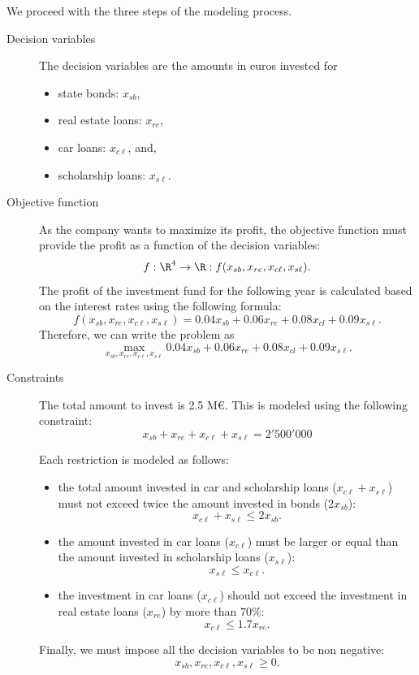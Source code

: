 
We proceed with the three steps of the modeling process.
\begin{description}
\item[Decision variables] The decision variables are the amounts in euros invested
  for
\begin{itemize}
\item   state bonds: $x_{sb}$,
\item real estate loans: $x_{re}$,
\item car loans:  $x_{c\ell}$, and,
 \item scholarship loans: $x_{s\ell}$.
\end{itemize}
\item[Objective function] As the company wants to maximize its profit,
  the objective function must provide the profit as a function of the
  decision variables:
  \[
f:\R^4 \to \R: f(x_{sb}, x_{re}, x_{c\ell},x_{s\ell}).
  \]
The profit of the investment fund for the following year is calculated
based on  the interest rates using the following formula:
\[
f(x_{sb}, x_{re}, x_{c\ell},x_{s\ell}) = 0.04 x_{sb} + 0.06 x_{re} + 0.08 x_{cl} + 0.09 x_{s\ell}. 
\]
Therefore, we can write the problem as 
\[
	\max_{x_{sb}, x_{re}, x_{c\ell},x_{s\ell}} 0.04 x_{sb} + 0.06 x_{re} + 0.08 x_{cl} + 0.09 x_{s\ell}. 
\]
\item[Constraints]
The total amount to invest is 2.5 M\euro.  This is modeled using the following constraint:
\[ 	x_{sb} + x_{re} + x_{c\ell} + x_{s\ell}  = 2'500'000 \]

Each restriction is modeled as follows:
\begin{itemize}
	\item the total amount invested in car and scholarship  loans
          ($	x_{c\ell} + x_{s\ell}$) must not exceed twice the
          amount invested in bonds ($2x_{sb}$):
	\[ 	x_{c\ell} + x_{s\ell}  \leq 2x_{sb}. \]
	\item the amount invested in car loans ($x_{c\ell}$) must be
          larger or equal than the
          amount invested in  scholarship loans ($x_{s\ell}$):
	\[ 	x_{s\ell}  \leq x_{c\ell}. \]
	\item the investment in car loans ($x_{c\ell}$) should not exceed the
          investment in real estate loans ($x_{re}$) by more than $70\%$:
	\[ 	x_{c\ell}  \leq 1.7x_{re}. \]
\end{itemize}  
Finally, we must impose all the decision variables to be non negative:
\[
	x_{sb}, x_{re}, x_{c\ell}, x_{s\ell} \geq 0.
\]
\end{description}



